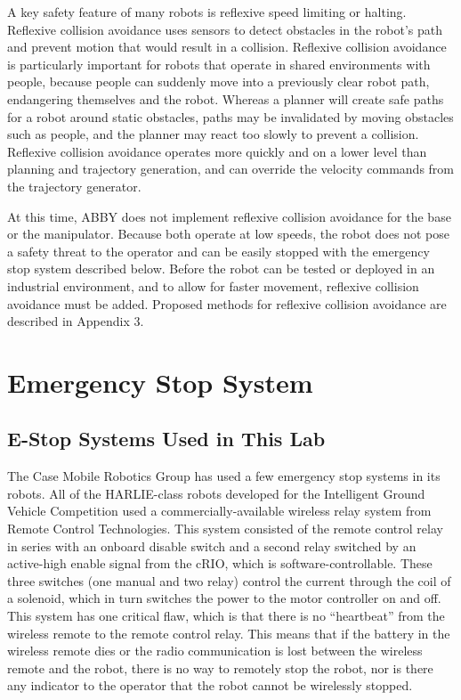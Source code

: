 \documentclass[]{cwru} %
\begin{document}
A key safety feature of many robots is reflexive speed limiting or
halting. Reflexive collision avoidance uses sensors to detect obstacles
in the robot's path and prevent motion that would result in a collision.
Reflexive collision avoidance is particularly important for robots that
operate in shared environments with people, because people can suddenly
move into a previously clear robot path, endangering themselves and the
robot. Whereas a planner will create safe paths for a robot around
static obstacles, paths may be invalidated by moving obstacles such as
people, and the planner may react too slowly to prevent a collision.
Reflexive collision avoidance operates more quickly and on a lower level
than planning and trajectory generation, and can override the velocity
commands from the trajectory generator.

At this time, ABBY does not implement reflexive collision avoidance for
the base or the manipulator. Because both operate at low speeds, the
robot does not pose a safety threat to the operator and can be easily
stopped with the emergency stop system described below. Before the robot
can be tested or deployed in an industrial environment, and to allow for
faster movement, reflexive collision avoidance must be added. Proposed
methods for reflexive collision avoidance are described in Appendix
3.

\section{Emergency Stop System}
\label{estop}

\subsection{E-Stop Systems Used in This Lab}

The Case Mobile Robotics Group has used a few emergency stop systems in
its robots. All of the HARLIE-class robots developed for the Intelligent
Ground Vehicle Competition used a commercially-available wireless relay
system from Remote Control Technologies. This system consisted of the
remote control relay in series with an onboard disable switch and a
second relay switched by an active-high enable signal from the cRIO,
which is software-controllable. These three switches (one manual and two
relay) control the current through the coil of a solenoid, which in turn
switches the power to the motor controller on and off. This system has
one critical flaw, which is that there is no ``heartbeat'' from the
wireless remote to the remote control relay. This means that if the
battery in the wireless remote dies or the radio communication is lost
between the wireless remote and the robot, there is no way to remotely
stop the robot, nor is there any indicator to the operator that the
robot cannot be wirelessly stopped.
\end{document}
